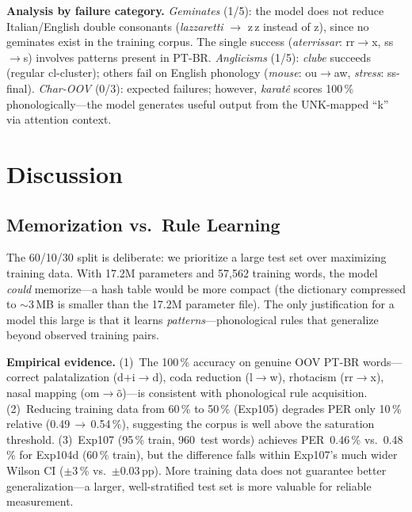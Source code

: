 \documentclass[conference]{IEEEtran}
\begin{document}
\textbf{Analysis by failure category.}
\emph{Geminates} (1/5): the model does not reduce Italian/English
double consonants (\textit{lazzaretti} $\to$ z\,z instead of z),
since no geminates exist in the training corpus.
The single success (\textit{aterrissar}: rr$\to$x, ss$\to$s)
involves patterns present in PT-BR.
\emph{Anglicisms} (1/5): \textit{clube} succeeds (regular
cl-cluster); others fail on English phonology
(\textit{mouse}: ou$\to$aw, \textit{stress}: ss-final).
\emph{Char-OOV} (0/3): expected failures; however,
\textit{karat\^{e}} scores 100\,\% phonologically---the model
generates useful output from the UNK-mapped ``k'' via attention
context.

\section{Discussion}
\label{sec:discussion}

\subsection{Memorization vs.\ Rule Learning}

The 60/10/30 split is deliberate: we prioritize a large test set
over maximizing training data.
With 17.2M parameters and 57{,}562 training words, the model
\emph{could} memorize---a hash table would be more compact
(the dictionary compressed to $\sim$3\,MB is smaller than the
17.2M parameter file).
The only justification for a model this large is that it learns
\emph{patterns}---phonological rules that generalize beyond
observed training pairs.

\textbf{Empirical evidence.}
(1)~The 100\,\% accuracy on genuine OOV PT-BR words---correct
palatalization (d+i$\to$d), coda reduction (l$\to$w),
rhotacism (rr$\to$x), nasal mapping (om$\to$\~{o})---is consistent
with phonological rule acquisition.
(2)~Reducing training data from 60\,\% to 50\,\% (Exp105) degrades
PER only 10\,\% relative (0.49\,$\to$\,0.54\,\%), suggesting the
corpus is well above the saturation threshold.
(3)~Exp107 (95\,\% train, 960~test words) achieves PER~0.46\,\%
vs.\ 0.48\,\% for Exp104d (60\,\% train), but the difference falls
within Exp107's much wider Wilson CI ($\pm$3\,\% vs.\ $\pm$0.03\,pp).
More training data does not guarantee better generalization---a larger,
well-stratified test set is more valuable for reliable measurement.
\end{document}

